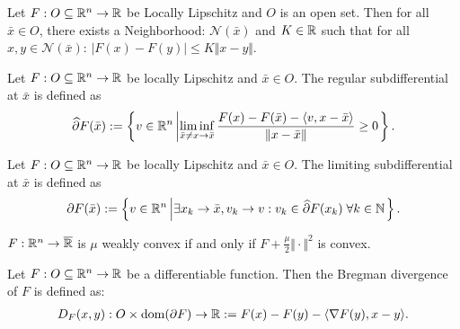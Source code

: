 \documentclass[12pt]{article}
\begin{document}
        \begin{definition}
            Let $F: O \subseteq \mathbb R^n \rightarrow \mathbb R$ be Locally Lipschitz and $O$ is an open set. 
            Then for all $\bar x \in O$, there exists a Neighborhood: $\mathcal N(\bar x)$ and $K \in \mathbb R$ such that for all $x, y \in \mathcal N(\bar x)$: $|F(x) - F(y)| \le K \Vert x - y\Vert$. 
        \end{definition}
        \begin{definition}
            Let $F: O \subseteq \mathbb R^n \rightarrow \mathbb R$ be locally Lipschitz and $\bar x \in O$. 
            The regular subdifferential at $\bar x$ is defined as 
            \begin{align*}
                \widehat \partial F(\bar x) := 
                \left\lbrace
                    v \in \mathbb R^n \left| 
                        \liminf_{\bar x \neq x\rightarrow \bar x}
                        \frac{F(x) - F(\bar x) - \langle v, x - \bar x\rangle}{\Vert x - \bar x\Vert} 
                        \ge 0
                    \right.
                \right\rbrace. 
            \end{align*}
        \end{definition}
        \begin{definition}
            Let $F: O \subseteq \mathbb R^n \rightarrow \mathbb R$ be locally Lipschitz and $\bar x \in O$. 
            The limiting subdifferential at $\bar x$ is defined as 
            \begin{align*}
                \partial F(\bar x) := 
                \left\lbrace
                    v \in \mathbb R^n \left| 
                        \exists x_k \rightarrow \bar x, v_k \rightarrow v: 
                        v_k \in \widehat \partial F(x_k) \;\forall k \in \mathbb N
                    \right.
                \right\rbrace. 
            \end{align*}
        \end{definition}
        \begin{definition}
            $F: \mathbb R^n \rightarrow \overline {\mathbb R}$ is $\mu$ weakly convex if and only if $F + \frac{\mu}{2}\Vert \cdot\Vert^2$ is convex. 
        \end{definition}
        \begin{definition}
            Let $F: O \subseteq \mathbb R^n \rightarrow \mathbb R$ be a differentiable function. 
            Then the Bregman divergence of $F$ is defined as: 
            \begin{align*}
                D_F(x, y): O \times \operatorname{dom}(\partial F) \rightarrow \mathbb R
                := F(x) - F(y) - \langle \nabla F(y), x - y\rangle. 
            \end{align*}
        \end{definition}
\end{document}
